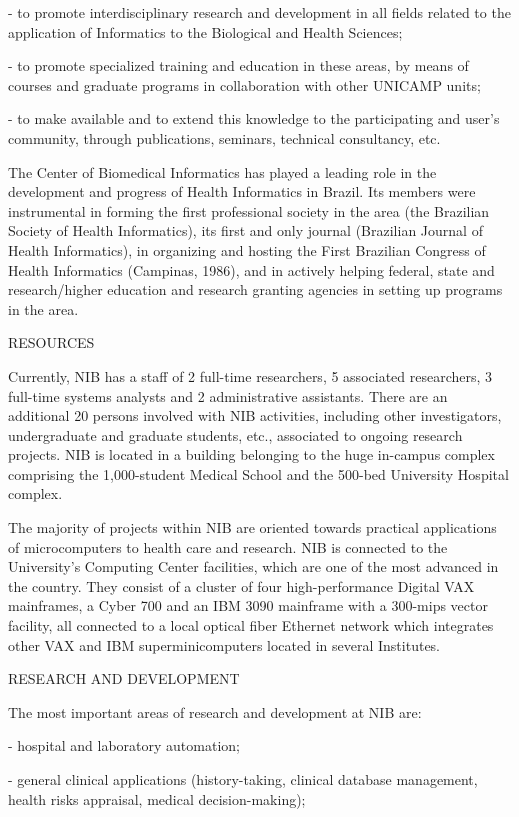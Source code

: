 - to promote interdisciplinary research and
  development in all fields related to the application of
  Informatics to the Biological and Health Sciences;
 
- to promote specialized training and education in
  these areas, by means of courses and graduate programs in
  collaboration with other UNICAMP units;
 
- to make available and to extend this knowledge to
  the participating and user's community, through
  publications, seminars, technical consultancy, etc.
 
The Center of Biomedical Informatics has played a leading
role in the development and progress of Health Informatics
in Brazil. Its members were instrumental in forming the
first professional society in the area (the Brazilian
Society of Health Informatics), its first and only journal
(Brazilian Journal of Health Informatics), in organizing and
hosting the First Brazilian Congress of Health Informatics
(Campinas, 1986), and in actively helping federal, state and
research/higher education and research granting agencies in
setting up programs in the area.
 
RESOURCES
 
Currently, NIB has a staff of 2 full-time researchers, 5
associated researchers, 3 full-time systems analysts and 2
administrative assistants. There are an additional 20
persons involved with NIB activities, including other
investigators, undergraduate and graduate students, etc.,
associated to ongoing research projects. NIB is located in a
building belonging to the huge in-campus complex comprising
the 1,000-student Medical School and the 500-bed University
Hospital complex.
 
The majority of projects within NIB are oriented towards
practical applications of microcomputers to health care and
research. NIB is connected to the University's Computing
Center facilities, which are one of the most advanced in the
country. They consist of a cluster of four high-performance
Digital VAX mainframes, a Cyber 700 and an IBM 3090
mainframe with a 300-mips vector facility, all connected to
a local optical fiber Ethernet network which integrates
other VAX and IBM superminicomputers located in several
Institutes.
 
 
RESEARCH AND DEVELOPMENT
 
The most important areas of research and development at NIB
are:
 
- hospital and laboratory automation;
 
- general clinical applications (history-taking,
  clinical database management, health risks appraisal,
  medical decision-making);
 
